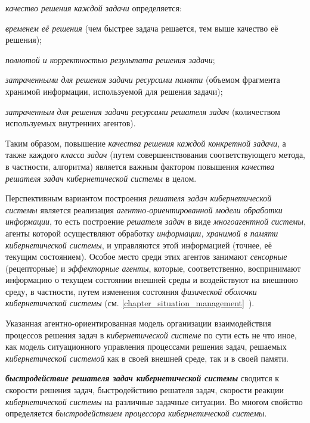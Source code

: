 \textit{качество решения каждой задачи} определяется:
\begin{textitemize}
    \item \textit{временем её решения} (чем быстрее задача решается, тем выше качество её решения);
    \item \textit{полнотой и корректностью результата решения задачи};
    \item \textit{затраченными для решения задачи ресурсами памяти} (объемом фрагмента хранимой информации, используемой для решения задачи);
    \item \textit{затраченным для решения задачи ресурсами решателя задач} (количеством используемых внутренних агентов).
\end{textitemize}

Таким образом, повышение \textit{качества решения каждой конкретной задачи}, а также каждого \textit{класса задач} (путем совершенствования соответствующего метода, в частности, алгоритма) является важным фактором повышения \textit{качества решателя задач кибернетической системы} в целом.

Перспективным вариантом построения \textit{решателя задач} \textit{кибернетической системы} является реализация \textit{агентно-ориентированной модели обработки информации}, то есть построение \textit{решателя задач} в виде \textit{многоагентной системы}, агенты которой осуществляют обработку \textit{информации, хранимой в памяти кибернетической системы}, и управляются этой информацией (точнее, её текущим состоянием). 
Особое место среди этих агентов занимают \textit{сенсорные} (рецепторные) и \textit{эффекторные агенты}, которые, соответственно, воспринимают информацию о текущем состоянии внешней среды и воздействуют на внешнюю среду, в частности, путем изменения состояния \textit{физической оболочки кибернетической системы} (см. \ref{chapter_situation_management}~).

Указанная агентно-ориентированная модель организации взаимодействия процессов решения задач в \textit{кибернетической системе} по сути есть не что иное, как модель ситуационного управления процессами решения задач, решаемых \textit{кибернетической системой} как в своей внешней среде, так и в своей памяти.

\textbf{\textit{быстродействие решателя задач кибернетической системы}} сводится к скорости решения задач, быстродействию решателя задач, скорости реакции \textit{кибернетической системы} на различные задачные ситуации. Во многом свойство определяется \textit{быстродействием процессора кибернетической системы}.

